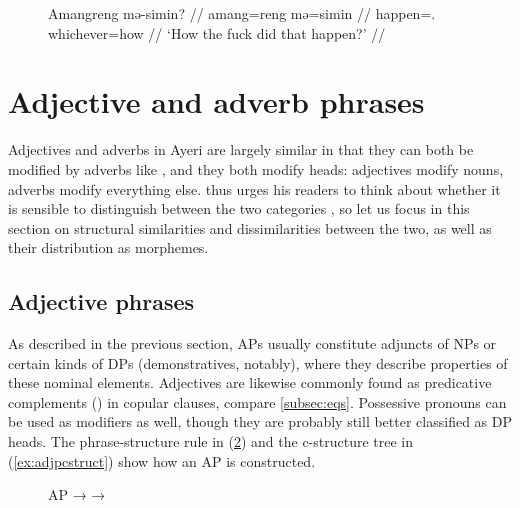 \begin{figure}[h]
\ex\label{ex:meinter}\begingl
	\gla Amangreng mə-simin? //
	\glb amang=reng mə=simin //
	\glc happen=\TsgI{}.\Aarg{} whichever=how //
	\glft `How the fuck did that happen?' //
\endgl\xe
\end{figure}


\section{Adjective and adverb phrases}
\label{sec:adjps-advps}

Adjectives and adverbs in Ayeri are largely similar in that they can both be
modified by adverbs like , and they both modify heads: adjectives
modify nouns, adverbs modify everything else. \citet{carnie2013} thus urges his
readers to think about whether it is sensible to distinguish between the two
categories \citep[51]{carnie2013}, so let us focus in this section on
structural similarities and dissimilarities between the two, as well as their
distribution as morphemes.

\subsection{Adjective phrases}
\label{subsec:adjps}

As described in the previous section, APs usually constitute adjuncts of NPs or
certain kinds of DPs (demonstratives, notably), where they describe properties
of these nominal elements. Adjectives are likewise commonly found as
predicative complements (\Plink{}) in copular clauses, compare
\autoref{subsec:eqs}. Possessive pronouns can be used as modifiers as well,
though they are probably still better classified as DP heads. The
phrase-structure rule in (\ref{ex:adjpstruct}) and the c-structure tree in
(\ref{ex:adjpcstruct}) show how an AP is constructed.

\begin{figure}[h]
\pex\label{ex:adjpstruct}
\a AP →  
\a {} →  
\xe
\end{figure}

